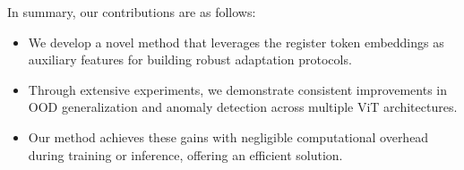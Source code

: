 In summary, our contributions are as follows:
\begin{itemize}
    \item We develop a novel method that leverages the register token embeddings as auxiliary features for building robust adaptation protocols.
    \item Through extensive experiments, we demonstrate consistent improvements in OOD generalization and anomaly detection across multiple ViT architectures.
    \item Our method achieves these gains with negligible computational overhead during training or inference, offering an efficient solution.
\end{itemize}